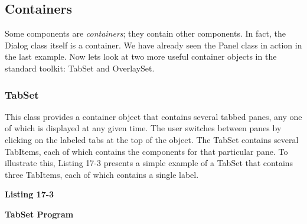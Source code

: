 
\subsection{Containers}

Some components are \textit{containers}; they contain other components.
In fact, the \textsf{Dialog} class itself is a container. We have
already seen the \textsf{Panel} class in action in the last example.
Now let{\textquotesingle}s look at two more useful container objects in the standard toolkit: \textsf{TabSet}
and \textsf{OverlaySet}.

\subsubsection[TabSet]{\sffamily TabSet}
This class provides a container object that contains several tabbed panes, any one of which is displayed at any given
time. The user switches between panes by clicking on the labeled tabs
at the top of the object. The \textsf{TabSet} contains several
\textsf{TabItems}, each of which contains the components for that
particular pane. To illustrate this, Listing 17-3 presents a simple
example of a \textsf{TabSet} that contains three \textsf{TabItems},
each of which contains a single label.

\bigskip

{\sffamily\bfseries
Listing 17-3}

{\sffamily\bfseries
TabSet Program}

